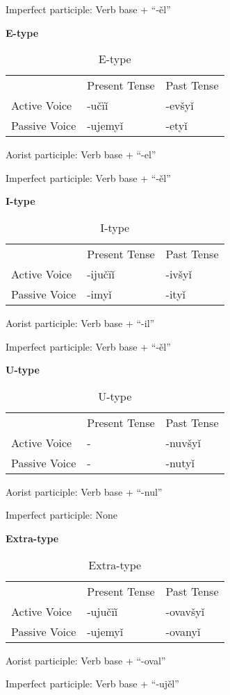Imperfect participle: Verb base + “-ěl”

\textbf{E-type}

\begin{table}[!htb]
	\caption{E-type}
	\begin{tabular}{lll}
		& Present Tense & Past Tense \\
		Active Voice & -učïǐ & -evšyǐ \\
		Passive Voice & -ujemyǐ & -etyǐ
	\end{tabular}
\end{table}

Aorist participle: Verb base + “-el”

Imperfect participle: Verb base + “-ěl”

\textbf{I-type}

\begin{table}[!htb]
	\caption{I-type}
	\begin{tabular}{lll}
		& Present Tense & Past Tense \\
		Active Voice & -ijučïǐ & -ivšyǐ \\
		Passive Voice & -imyǐ & -ityǐ
	\end{tabular}
\end{table}

Aorist participle: Verb base + “-il”

Imperfect participle: Verb base + “-ěl”

\textbf{U-type}

\begin{table}[!htb]
	\caption{U-type}
	\begin{tabular}{lll}
		& Present Tense & Past Tense \\
		Active Voice & - & -nuvšyǐ \\
		Passive Voice & - & -nutyǐ
	\end{tabular}
\end{table}

Aorist participle: Verb base + “-nul”

Imperfect participle: None

\textbf{Extra-type }

\begin{table}[!htb]
	\caption{Extra-type}
	\begin{tabular}{lll}
		& Present Tense & Past Tense \\
		Active Voice & -ujučïǐ & -ovavšyǐ \\
		Passive Voice & -ujemyǐ & -ovanyǐ
	\end{tabular}
\end{table}

Aorist participle: Verb base + “-oval”

Imperfect participle: Verb base + “-ujěl”
